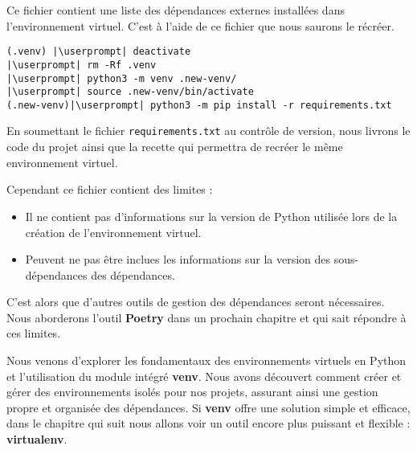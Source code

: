 Ce fichier contient une liste des dépendances externes installées dans l'environnement virtuel. C'est à l'aide de ce fichier que nous saurons le récréer.
\begin{lstlisting}[style=bash]
(.venv) |\userprompt| deactivate
|\userprompt| rm -Rf .venv
|\userprompt| python3 -m venv .new-venv/
|\userprompt| source .new-venv/bin/activate
(.new-venv)|\userprompt| python3 -m pip install -r requirements.txt
\end{lstlisting}

En soumettant le fichier \texttt{requirements.txt} au contrôle de version, nous livrons le code du projet ainsi que la recette qui permettra de recréer le même environnement virtuel.

Cependant ce fichier contient des limites : 

\begin{itemize}
    \item Il ne contient pas d'informations sur la version de Python utilisée lors de la création de l'environnement virtuel.
    \item Peuvent ne pas être inclues les informations sur la version des sous-dépendances des dépendances.
\end{itemize}

C'est alors que d'autres outils de gestion des dépendances seront nécessaires. Nous aborderons l'outil \textbf{Poetry} dans un prochain chapitre et qui sait répondre à ces limites.
\bigskip

\begin{center}
\end{center}

Nous venons d'explorer les fondamentaux des environnements virtuels en Python et l'utilisation du module intégré \textbf{venv}. Nous avons découvert comment créer et gérer des environnements isolés pour nos projets, assurant ainsi une gestion propre et organisée des dépendances. Si \textbf{venv} offre une solution simple et efficace, dans le chapitre qui suit nous allons voir un outil encore plus puissant et flexible : \textbf{virtualenv}. 


